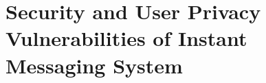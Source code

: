 \section{Security and User Privacy Vulnerabilities of Instant Messaging System}
\label{sec:security-and-user-privacy-vulnerabilities-of-instant-messaging-system}



%
%
%
%


